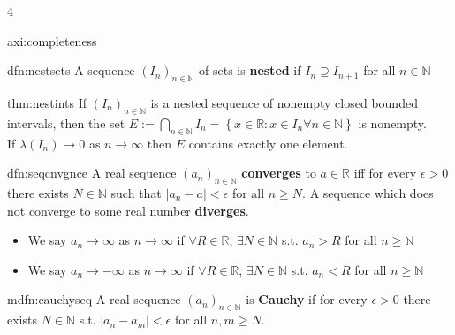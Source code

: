 \documentclass[landscape, 8pt]{extarticle}
\begin{document}
\begin{multicols*}{4}
\begin{axi}{axi:completeness}{ }
		\end{axi}
		
		
		\begin{dfn}{dfn:nestsets}{ }
			A sequence $(I_n)_{n \in \mathbb{N}}$ of sets is \textbf{nested} if $I_n \supseteq I_{n+1}$ for all $n \in \mathbb{N}$
			
		\end{dfn}
		
		
		\begin{thm}{thm:nestints}{ }
			If $(I_n)_{n \in \mathbb{N}}$ is a nested sequence of nonempty closed bounded intervals, then the set $E := \bigcap_{n \in \mathbb{N}}I_n = \left\{x \in \mathbb{R}: x \in I_n \forall n \in \mathbb{N}\right\}$ is nonempty. \\
			If $\lambda(I_n) \to 0$ as $n \to \infty$ then $E$ contains exactly one element.
			
		\end{thm}
		
		
		\begin{dfn}{dfn:seqcnvgnce}{ }
			A real sequence $(a_n)_{n \in \mathbb{N}}$ \textbf{converges} to $a \in \mathbb{R}$ iff for every $\epsilon > 0$ there exists $N \in \mathbb{N}$ such that $\left|a_n - a\right| <\epsilon$ for all $n \ge N$. A sequence which does not converge to some real number \textbf{diverges}.
			\begin{itemize}
				\item We say $a_n \to \infty$ as $n \to \infty$ if $\forall R \in \mathbb{R}$, $\exists N \in \mathbb{N}$ s.t. $a_n > R$ for all $n \ge \mathbb{N}$
				\item We say $a_n \to -\infty$ as $n \to \infty$ if $\forall R \in \mathbb{R}$, $\exists N \in \mathbb{N}$ s.t. $a_n < R$ for all $n \ge \mathbb{N}$
			\end{itemize}
			
		\end{dfn}
		
		
		\begin{mdfn}{mdfn:cauchyseq}{ }
			A real sequence $(a_n)_{n \in \mathbb{N}}$ is \textbf{Cauchy} if for every $\epsilon > 0$ there exists $N \in \mathbb{N}$ s.t. $\left|a_n - a_m\right| <\epsilon$ for all $n, m \ge N$.\\
			
		\end{mdfn}
		

\end{multicols*}
\end{document}
